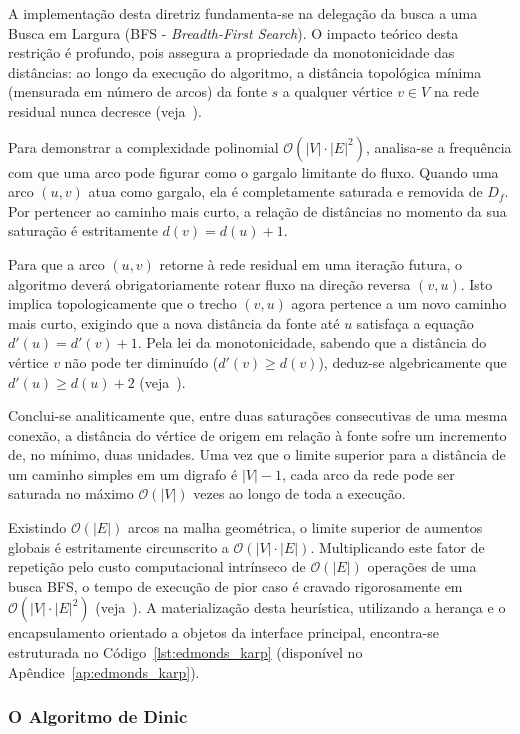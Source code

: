 \documentclass[12pt,a4paper]{article}
\begin{document}
A implementação desta diretriz fundamenta-se na delegação da busca a uma Busca em Largura (BFS - \textit{Breadth-First Search}). O impacto teórico desta restrição é profundo, pois assegura a propriedade da monotonicidade das distâncias: ao longo da execução do algoritmo, a distância topológica mínima (mensurada em número de arcos) da fonte $s$ a qualquer vértice $v \in V$ na rede residual nunca decresce (veja~\cite{cook1998combinatorial}).

Para demonstrar a complexidade polinomial $\mathcal{O}(|V| \cdot |E|^2)$, analisa-se a frequência com que uma arco pode figurar como o gargalo limitante do fluxo. Quando uma arco $(u,v)$ atua como gargalo, ela é completamente saturada e removida de $D_f$. Por pertencer ao caminho mais curto, a relação de distâncias no momento da sua saturação é estritamente $d(v) = d(u) + 1$.

Para que a arco $(u,v)$ retorne à rede residual em uma iteração futura, o algoritmo deverá obrigatoriamente rotear fluxo na direção reversa $(v,u)$. Isto implica topologicamente que o trecho $(v,u)$ agora pertence a um novo caminho mais curto, exigindo que a nova distância da fonte até $u$ satisfaça a equação $d'(u) = d'(v) + 1$. Pela lei da monotonicidade, sabendo que a distância do vértice $v$ não pode ter diminuído ($d'(v) \ge d(v)$), deduz-se algebricamente que $d'(u) \ge d(u) + 2$ (veja~\cite{ahuja1993network}).

Conclui-se analiticamente que, entre duas saturações consecutivas de uma mesma conexão, a distância do vértice de origem em relação à fonte sofre um incremento de, no mínimo, duas unidades. Uma vez que o limite superior para a distância de um caminho simples em um digrafo é $|V| - 1$, cada arco da rede pode ser saturada no máximo $\mathcal{O}(|V|)$ vezes ao longo de toda a execução.

Existindo $\mathcal{O}(|E|)$ arcos na malha geométrica, o limite superior de aumentos globais é estritamente circunscrito a $\mathcal{O}(|V| \cdot |E|)$. Multiplicando este fator de repetição pelo custo computacional intrínseco de $\mathcal{O}(|E|)$ operações de uma busca BFS, o tempo de execução de pior caso é cravado rigorosamente em $\mathcal{O}(|V| \cdot |E|^2)$ (veja~\cite{korte2018combinatorial}). A materialização desta heurística, utilizando a herança e o encapsulamento orientado a objetos da interface principal, encontra-se estruturada no Código~\ref{lst:edmonds_karp} (disponível no Apêndice~\ref{ap:edmonds_karp}).

\subsubsection{O Algoritmo de Dinic}
\end{document}

